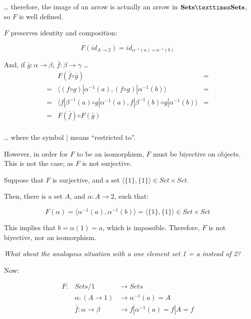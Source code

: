 \documentclass[notitlepage]{article}
\begin{document}
\begin{enumerate}
    … therefore, the image of an arrow is actually an arrow in ${\bf Sets × Sets}$, so $F$ is well defined.
    
    $F$ preserves identity and composition:

    $$F(id_{A→2}) = id_{α^{-1}(a)×α^{-1}(b)}$$

    And, if $\bar{g} : α → β$, $\bar{f} : β → γ$ …
    \begin{equation*}
    \begin{array}{rcl}
       & F(\bar{f} ◦ \bar{g})                        & = \\
    =  & \langle (f ◦ g)|α^{-1}(a), (f ◦ g)|α^{-1}(b) \rangle        & = \\
    =  & \langle f|β^{-1}(a) ◦ g|α^{-1}(a), f|β^{-1}(b) ◦ g|α^{-1}(b) \rangle & = \\
    =  & F(\bar{f}) ◦ F(\bar{g}) & \\ 
    \end{array}
    \end{equation*}

    … where the symbol $|$ means “restricted to”.
    
    However, in order for $F$ to be an isomorphism, $F$ must be biyective
    on objects. This is not the case; as $F$ is not
    surjective.

    Suppose that $F$ is surjective, and a set $\langle \{1\}, \{1\} \rangle ∈ Set × Set$.

    Then, there is a set $A$, and $α : A → 2$, such that:

    $$F(α) = \langle α^{-1}(a), α^{-1}(b) \rangle = \langle \{1\}, \{1\} \rangle ∈ Set × Set$$

    This implies that $b = α(1) = a$, which is impossible. Therefore,
    $F$ is not biyective, nor an isomorphism.


    

   
{\em What about the analogous situation with a one element set 1 = {a} instead of 2?}

    Now:

    \begin{equation*}
    \begin{array}{rll}
      F : & Sets/1           & → Sets                   \\
          & α : (A → 1)      & → α^{-1}(a)   = A         \\
          & \bar{f} : α → β  & → f|α^{-1}(a) = f|A  = f  \\
    \end{array}
    \end{equation*}


\end{enumerate}
\end{document}
